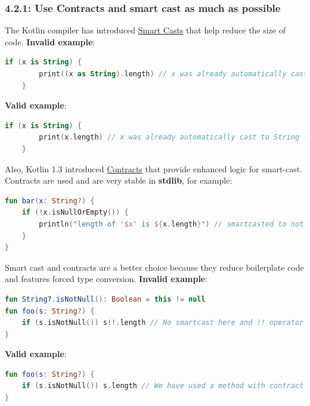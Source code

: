 \subsubsection*{\textbf{4.2.1: Use Contracts and smart cast as much as possible}}
\leavevmode\newline
\label{sec:4.2.1}
The Kotlin compiler has introduced \href{https://kotlinlang.org/docs/reference/typecasts.html#smart-casts}{Smart Casts} that help reduce the size of code.
\textbf{Invalid example}:
\begin{lstlisting}[language=Kotlin]
    if (x is String) {
        print((x as String).length) // x was already automatically cast to String - no need to use 'as' keyword here
    }
\end{lstlisting}
\textbf{Valid example}:
\begin{lstlisting}[language=Kotlin]
    if (x is String) {
        print(x.length) // x was already automatically cast to String - no need to use 'as' keyword here
    }
\end{lstlisting}
Also, Kotlin 1.3 introduced \href{https://kotlinlang.org/docs/reference/whatsnew13.html#contracts}{Contracts} that provide enhanced logic for smart-cast.
Contracts are used and are very stable in \textbf{stdlib}, for example:

\begin{lstlisting}[language=Kotlin]
fun bar(x: String?) {
    if (!x.isNullOrEmpty()) {
        println("length of '$x' is ${x.length}") // smartcasted to not-null
    }
}
\end{lstlisting}
Smart cast and contracts are a better choice because they reduce boilerplate code and features forced type conversion.
\textbf{Invalid example}:
\begin{lstlisting}[language=Kotlin]
fun String?.isNotNull(): Boolean = this != null
fun foo(s: String?) {
    if (s.isNotNull()) s!!.length // No smartcast here and !! operator is used
}
\end{lstlisting}
\textbf{Valid example}:
\begin{lstlisting}[language=Kotlin]
fun foo(s: String?) {
    if (s.isNotNull()) s.length // We have used a method with contract from stdlib that helped compiler to execute smart cast
}
\end{lstlisting}
